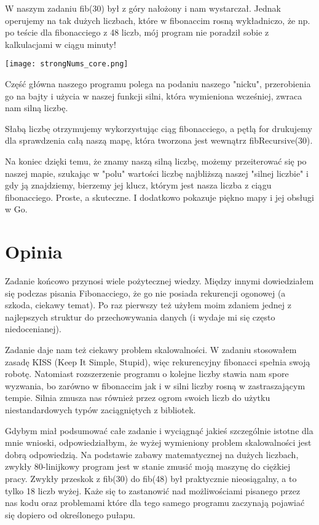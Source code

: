 \documentclass{article}
\begin{document}
W naszym zadaniu fib(30) był z góry nałożony i nam wystarczał. Jednak operujemy na tak dużych liczbach, które w fibonaccim rosną wykładniczo, że np. po teście dla fibonacciego z 48 liczb, mój program nie poradził sobie z kalkulacjami w ciągu minuty!

\vspace{2em}

\texttt{[image: strongNums\_core.png]}

\vspace{1em}

Część główna naszego programu polega na podaniu naszego "nicku", przerobienia go na bajty i użycia w naszej funkcji silni, która wymieniona wcześniej, zwraca nam silną liczbę.

Słabą liczbę otrzymujemy wykorzystując ciąg fibonacciego, a pętlą for drukujemy dla sprawdzenia całą naszą mapę, która tworzona jest wewnątrz fibRecursive(30).

Na koniec dzięki temu, że znamy naszą silną liczbę, możemy przeiterować się po naszej mapie, szukając w "polu" wartości liczbę najbliższą naszej "silnej liczbie" i gdy ją znajdziemy, bierzemy jej klucz, którym jest nasza liczba z ciągu fibonacciego. Proste, a skuteczne. I dodatkowo pokazuje piękno mapy i jej obsługi w Go.

\section{Opinia}

\vspace{1em}

Zadanie końcowo przynosi wiele pożytecznej wiedzy. Między innymi dowiedziałem się podczas pisania Fibonacciego, że go nie posiada rekurencji ogonowej (a szkoda, ciekawy temat). Po raz pierwszy też użyłem moim zdaniem jednej z najlepszych struktur do przechowywania danych (i wydaje mi się często niedocenianej).

\vspace{1em}

Zadanie daje nam też ciekawy problem skalowalności. W zadaniu stosowałem zasadę KISS (Keep It Simple, Stupid), więc rekurencyjny fibonacci spełnia swoją robotę. Natomiast rozszerzenie programu o kolejne liczby stawia nam spore wyzwania, bo zarówno w fibonaccim jak i w silni liczby rosną w zastraszającym tempie. Silnia zmusza nas również przez ogrom swoich liczb do użytku niestandardowych typów zaciągniętych z bibliotek.

\vspace{1em}

Gdybym miał podsumować całe zadanie i wyciągnąć jakieś szczególnie istotne dla mnie wnioski, odpowiedziałbym, że wyżej wymieniony problem skalowalności jest dobrą odpowiedzią. Na podstawie zabawy matematycznej na dużych liczbach, zwykły 80-linijkowy program jest w stanie zmusić moją maszynę do ciężkiej pracy. Zwykły przeskok z fib(30) do fib(48) był praktycznie nieosiągalny, a to tylko 18 liczb wyżej. Każe się to zastanowić nad możliwościami pisanego przez nas kodu oraz problemami które dla tego samego programu zaczynają pojawiać się dopiero od określonego pułapu.
\end{document}

